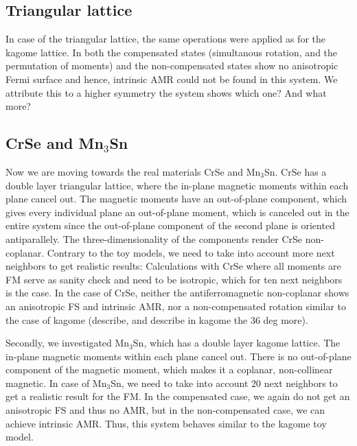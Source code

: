 \documentclass[prb,showpacs,amsmath,amssymb,superscriptaddress,twocolumn,floatfix]{revtex4-1}
\begin{document}

\subsection{Triangular lattice}
In case of the triangular lattice, the same operations were applied as for the kagome lattice. In both the compensated states (simultanous rotation, and the permutation of moments) and the non-compensated states show no anisotropic Fermi surface and hence, intrinsic AMR could not be found in this system. We attribute this to a higher symmetry the system shows {\color{red} which one? And what more?}

\subsection{CrSe and Mn$_3$Sn}
Now we are moving towards the real materials CrSe and Mn$_3$Sn. CrSe has a double layer triangular lattice, where the in-plane magnetic moments within each plane cancel out. The magnetic moments have an out-of-plane component, which gives every individual plane an out-of-plane moment, which is canceled out in the entire system since the out-of-plane component of the second plane is oriented antiparallely. The three-dimensionality of the components render CrSe non-coplanar. {\color{red} Contrary to the toy models, we need to take into account more next neighbors to get realistic results: Calculations with CrSe where all moments are FM serve as sanity check and need to be isotropic, which for ten next neighbors is the case}. In the case of CrSe, neither the antiferromagnetic non-coplanar shows an anisotropic FS and intrinsic AMR, nor a non-compensated rotation similar to the case of kagome {\color{red} (describe, and describe in kagome the 36 deg more)}.

Secondly, we investigated Mn$_3$Sn, which has a double layer kagome lattice. The in-plane magnetic moments within each plane cancel out. There is no out-of-plane component of the magnetic moment, which makes it a coplanar, non-collinear magnetic. {\color{red} In case of Mn$_3$Sn, we need to take into account 20 next neighbors to get a realistic result for the FM.} In the compensated case, we again do not get an anisotropic FS and thus no AMR, but in the non-compensated case, we can achieve intrinsic AMR. Thus, this system behaves similar to the kagome toy model.
\end{document}
